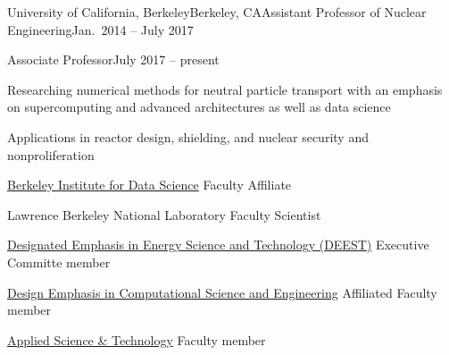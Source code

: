 \begin{rSubsection}{University of California, Berkeley}{Berkeley, CA}{Assistant
Professor of Nuclear Engineering}{Jan.\ 2014 -- July 2017}
\end{rSubsection}
\vspace*{-2 em}
\begin{rSubsection}{}{}{Associate Professor}{July 2017 -- present}
\item Researching numerical methods for neutral particle transport with an emphasis on supercomputing and advanced architectures as well as data science
\item Applications in reactor design, shielding, and nuclear security and nonproliferation
\item \href{http://bids.berkeley.edu/}{Berkeley Institute for Data Science}
Faculty Affiliate
\item Lawrence Berkeley National Laboratory Faculty Scientist
\item \href{https://me.berkeley.edu/graduate/special-programs/deest/}{Designated
Emphasis in Energy Science and Technology (DEEST)} Executive Committe member
\item \href{http://citris-uc.org/decse-mission/}{Design Emphasis in Computational Science and Engineering} Affiliated Faculty member
\item \href{http://ast.coe.berkeley.edu/}{Applied Science \& Technology} Faculty member
\end{rSubsection}


